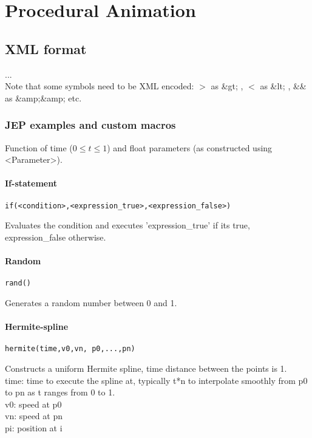 \section{Procedural Animation}

\subsection{XML format}
...\\
Note that some symbols need to be XML encoded: $>$ as \&gt; , $<$ as \&lt; , \&\& as \&amp;\&amp; etc.
\subsubsection{JEP examples and custom macros}
Function of time ($0 \leq t \leq 1$) and float parameters (as constructed using \textless Parameter\textgreater).

\paragraph{If-statement}
\begin{verbatim}
if(<condition>,<expression_true>,<expression_false>)
\end{verbatim}
Evaluates the condition and executes 'expression\_true' if its true, expression\_false otherwise.

\paragraph{Random}
\begin{verbatim}rand()\end{verbatim}
Generates a random number between 0 and 1.

\paragraph{Hermite-spline}
\begin{verbatim}
hermite(time,v0,vn, p0,...,pn)
\end{verbatim}
Constructs a uniform Hermite spline, time distance between the points is 1.\\
time: time to execute the spline at, typically t*n to interpolate smoothly from p0 to pn as t ranges from 0 to 1.\\
v0:		speed at p0\\
vn:   speed at pn\\
pi:		position at i\\

